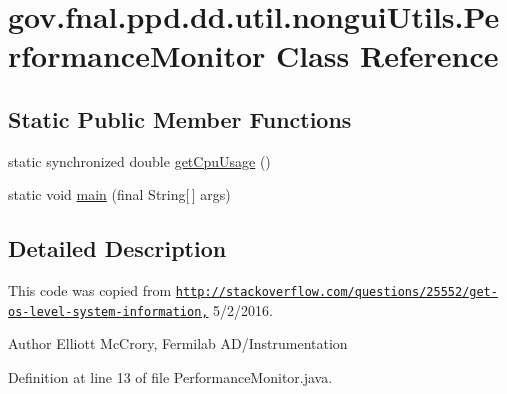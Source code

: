 \hypertarget{classgov_1_1fnal_1_1ppd_1_1dd_1_1util_1_1nonguiUtils_1_1PerformanceMonitor}{\section{gov.\-fnal.\-ppd.\-dd.\-util.\-nongui\-Utils.\-Performance\-Monitor Class Reference}
\label{classgov_1_1fnal_1_1ppd_1_1dd_1_1util_1_1nonguiUtils_1_1PerformanceMonitor}
}
\subsection*{Static Public Member Functions}
\begin{DoxyCompactItemize}
\item 
static synchronized double \hyperlink{classgov_1_1fnal_1_1ppd_1_1dd_1_1util_1_1nonguiUtils_1_1PerformanceMonitor_a461715794dca1f1139cf3f332cb95577}{get\-Cpu\-Usage} ()
\item 
static void \hyperlink{classgov_1_1fnal_1_1ppd_1_1dd_1_1util_1_1nonguiUtils_1_1PerformanceMonitor_abdccedb86427a4445b459cbebd4c6424}{main} (final String\mbox{[}$\,$\mbox{]} args)
\end{DoxyCompactItemize}


\subsection{Detailed Description}
This code was copied from \href{http://stackoverflow.com/questions/25552/get-os-level-system-information,}{\tt http\-://stackoverflow.\-com/questions/25552/get-\/os-\/level-\/system-\/information,} 5/2/2016.

\begin{DoxyAuthor}{Author}
Elliott Mc\-Crory, Fermilab A\-D/\-Instrumentation 
\end{DoxyAuthor}


Definition at line 13 of file Performance\-Monitor.\-java.



